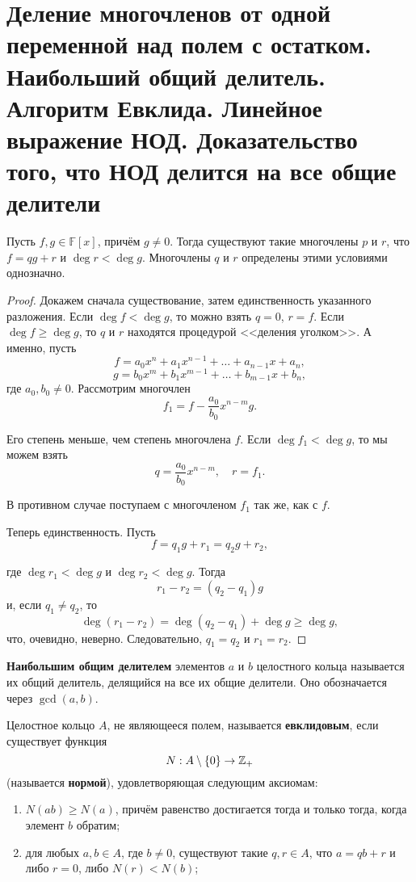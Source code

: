 \section{Деление многочленов от одной переменной над полем с остатком. Наибольший общий делитель. Алгоритм Евклида. Линейное выражение НОД. Доказательство того, что НОД делится на все общие делители}

\begin{theorem}
    Пусть $f, g \in \mathbb{F}[x]$, причём $g \ne 0$. Тогда существуют такие многочлены $p$ и $r$, что $f = qg + r$ и $\deg r < \deg g$. Многочлены $q$ и $r$ определены этими условиями однозначно.
\end{theorem}

\begin{proof}
    Докажем сначала существование, затем единственность указанного разложения. Если $\deg f < \deg g$, то можно взять $q = 0$, $r = f$. Если $\deg f \geqslant \deg g$, то $q$ и $r$ находятся процедурой <<деления уголком>>. А именно, пусть
    $$
    f = a_0x^n + a_1x^{n - 1} + \ldots + a_{n - 1}x + a_n,
    $$
    $$
    g = b_0x^m + b_1x^{m - 1} + \ldots + b_{m - 1}x + b_n,
    $$
    где $a_0, b_0 \ne 0$. Рассмотрим многочлен
    $$
    f_1 = f - \frac{a_0}{b_0}x^{n - m}g.
    $$

    Его степень меньше, чем степень многочлена $f$. Если $\deg f_1 < \deg g$, то мы можем взять
    $$
    q = \frac{a_0}{b_0}x^{n - m},\quad r = f_1.
    $$

    В противном случае поступаем с многочленом $f_1$ так же, как с $f$.

    Теперь единственность. Пусть
    $$
    f = q_1g + r_1 = q_2g + r_2,
    $$

    где $\deg r_1 < \deg g$ и $\deg r_2 < \deg g$. Тогда
    $$
    r_1 - r_2 = (q_2 - q_1)g
    $$
    и, если $q_1 \ne q_2$, то
    $$
    \deg(r_1 - r_2) = \deg(q_2 - q_1) + \deg g \geqslant \deg g,
    $$
    что, очевидно, неверно. Следовательно, $q_1 = q_2$ и $r_1 = r_2$.
\end{proof}

\begin{definition}
    \textbf{Наибольшим общим делителем} элементов $a$ и $b$ целостного кольца называется их общий делитель, делящийся на все их общие делители. Оно обозначается через $\gcd(a, b)$.
\end{definition}

\begin{definition}
    Целостное кольцо $A$, не являющееся полем, называется \textbf{евклидовым}, если существует функция
    $$
    N: A \setminus \{0\} \rightarrow \mathbb{Z}_+
    $$
    (называется \textbf{нормой}), удовлетворяющая следующим аксиомам:
    \begin{enumerate}[nolistsep]
        \item $N(ab) \geqslant N(a)$, причём равенство достигается тогда и только тогда, когда элемент $b$ обратим;
        \item для любых $a, b \in A$, где $b \ne 0$, существуют такие $q, r \in A$, что $a = qb + r$ и либо $r = 0$, либо $N(r) < N(b)$;
    \end{enumerate}
\end{definition}


